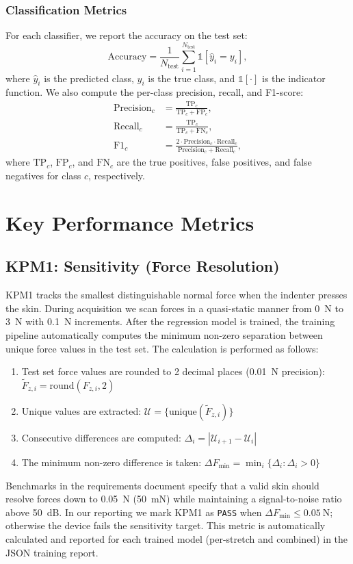 \documentclass[11pt,a4paper]{article}
\begin{document}
\subsubsection{Classification Metrics}
For each classifier, we report the accuracy on the test set:
\[
    \text{Accuracy} = \frac{1}{N_{\text{test}}} \sum_{i=1}^{N_{\text{test}}} \mathbb{1}[\hat{y}_i = y_i],
\]
where \(\hat{y}_i\) is the predicted class, \(y_i\) is the true class, and \(\mathbb{1}[\cdot]\) is the
indicator function. We also compute the per-class precision, recall, and F1-score:
\begin{align}
    \text{Precision}_c &= \frac{\text{TP}_c}{\text{TP}_c + \text{FP}_c}, \\
    \text{Recall}_c &= \frac{\text{TP}_c}{\text{TP}_c + \text{FN}_c}, \\
    \text{F1}_c &= \frac{2 \cdot \text{Precision}_c \cdot \text{Recall}_c}{\text{Precision}_c + \text{Recall}_c},
\end{align}
where \(\text{TP}_c\), \(\text{FP}_c\), and \(\text{FN}_c\) are the true positives, false positives, and
false negatives for class \(c\), respectively.

\section{Key Performance Metrics}

\subsection{KPM1: Sensitivity (Force Resolution)}
\label{sec:kpm1}
KPM1 tracks the smallest distinguishable normal force when the indenter presses the skin.
During acquisition we scan forces in a quasi-static manner from 0~N to 3~N with
\SI{0.1}{\newton} increments. After the regression model is trained, the training pipeline automatically computes the minimum
non-zero separation between unique force values in the test set. The calculation is performed as follows:
\begin{enumerate}[leftmargin=1.5em]
    \item Test set force values are rounded to 2 decimal places (0.01~N precision): \(\tilde{F}_{z,i} = \text{round}(F_{z,i}, 2)\)
    \item Unique values are extracted: \(\mathcal{U} = \{\text{unique}(\tilde{F}_{z,i})\}\)
    \item Consecutive differences are computed: \(\Delta_i = |\mathcal{U}_{i+1} - \mathcal{U}_i|\)
    \item The minimum non-zero difference is taken: \(\Delta F_{\text{min}} = \min_i \{\Delta_i : \Delta_i > 0\}\)
\end{enumerate}
Benchmarks in the requirements document specify that a valid skin should resolve forces down to
\SI{0.05}{\newton} (50~mN) while maintaining a signal-to-noise ratio above 50~dB. In our reporting
we mark KPM1 as \texttt{PASS} when \(\Delta F_{\text{min}} \leq 0.05~\text{N}\); otherwise the device
fails the sensitivity target. This metric is automatically calculated and reported for each trained model (per-stretch and combined) in the JSON training report.
\end{document}
